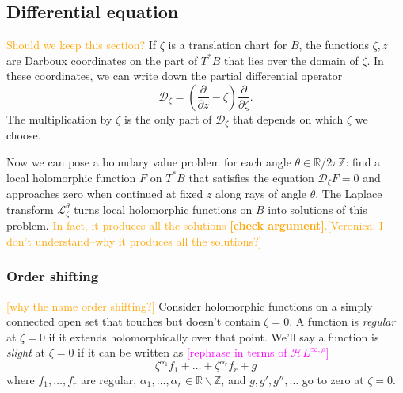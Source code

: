 \documentclass{article}
\theoremstyle{definition}
\newcommand{\Z}{\mathbb{Z}}
\newcommand{\R}{\mathbb{R}}
\newcommand{\holoL}[1]{\mathcal{H}L^{#1}} %
\newcommand{\laplacepde}{\mathcal{D}}
\newcommand{\laplace}{\mathcal{L}}
\begin{document}
\subsection{Differential equation}
\textcolor{orange}{Should we keep this section?}
If $\zeta$ is a translation chart for $B$, the functions $\zeta, z$ are Darboux coordinates on the part of $T^*B$ that lies over the domain of $\zeta$. In these coordinates, we can write down the partial differential operator
\begin{equation}%
\laplacepde_\zeta = \left(\frac{\partial}{\partial z} - \zeta\right) \frac{\partial}{\partial \zeta}.
\end{equation}
The multiplication by $\zeta$ is the only part of $\laplacepde_\zeta$ that depends on which $\zeta$ we choose.

Now we can pose a boundary value problem for each angle $\theta \in \R/2\pi\Z$: find a local holomorphic function $F$ on $T^*B$ that satisfies the equation $\laplacepde_\zeta F = 0$ and approaches zero when continued at fixed $z$ along rays of angle $\theta$.
The Laplace transform $\laplace_\zeta^\theta$ turns local holomorphic functions on $B$ into solutions of this problem. \textcolor{orange}{In fact, it produces all the solutions \textbf{[check argument]}.[Veronica: I don't understand--why it produces all the solutions?]}

\subsubsection{Order shifting}\label{shifting}
\textcolor{orange}{[why the name order shifting?]}
Consider holomorphic functions on a simply connected open set that touches but doesn't contain $\zeta = 0$. A function is {\em regular} at $\zeta = 0$ if it extends holomorphically over that point. We'll say a function is {\em slight} at $\zeta = 0$ if it can be written as \textcolor{magenta}{[rephrase in terms of $\holoL{\infty, \rho}$]}
\begin{equation}\label{eqn:slight-defn}
\zeta^{\alpha_1} f_1 + \ldots + \zeta^{\alpha_r} f_r + g
\end{equation}
where $f_1, \ldots, f_r$ are regular, $\alpha_1, \ldots, \alpha_r \in \R \smallsetminus \Z$, and $g, g', g'', \ldots$ go to zero at $\zeta = 0$.
\end{document}
